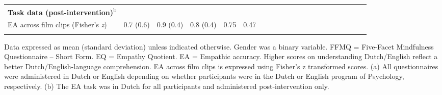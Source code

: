 \documentclass[authordate, empirical]{jote-new-article}
\begin{document}
\begin{table}[h!]
\begin{fullwidth}
\begin{tabularx}{\linewidth}{@{} l l l l l l l l l l l l l l l l l l l l l  @{}}
         \textbf{Task data (post-intervention)}\textsuperscript{b} &  &  &  &
        &  \\

         EA across film clips (Fisher’s \emph{z}) & 0.7 (0.6) & 0.9 (0.4) & 0.8 (0.4)
        & 0.75 & 0.47 \\

\bottomrule
                                                                \\
    \end{tabularx}
    Data expressed as mean (standard deviation) unless indicated otherwise. Gender was a binary variable. FFMQ = Five-Facet Mindfulness Questionnaire -- Short Form. EQ = Empathy Quotient. EA = Empathic accuracy. Higher scores on understanding Dutch/English reflect a better Dutch/English-language comprehension. EA across film clips is expressed using Fisher's z transformed scores. (a) All questionnaires were administered in Dutch or English depending on whether participants were in the Dutch or English program of Psychology, respectively. (b) The EA task was in Dutch for all participants and administered post-intervention only.
\end{fullwidth}
\end{table}

\clearpage
\end{document}
